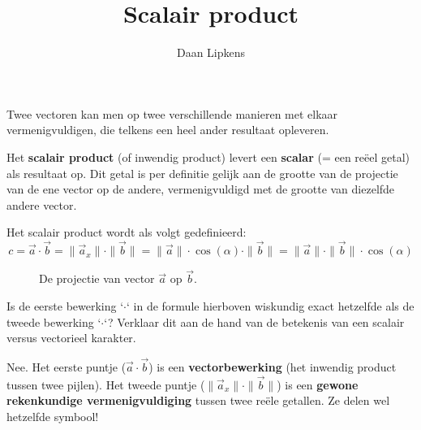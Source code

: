 \documentclass{ximera}
\title{Scalair product}
\author{Daan Lipkens}
\begin{document}
\begin{abstract}
\end{abstract}
\maketitle


Twee vectoren kan men op twee verschillende manieren met elkaar vermenigvuldigen, die telkens een heel ander resultaat opleveren. 

Het \textbf{scalair product} (of inwendig product) levert een \textbf{scalar} (= een reëel getal) als resultaat op. Dit getal is per definitie gelijk aan de grootte van de projectie van de ene vector op de andere, vermenigvuldigd met de grootte van diezelfde andere vector. 

Het scalair product wordt als volgt gedefinieerd: 
\[ c = \vec{a} \cdot \vec{b} = \| \vec{a}_x \| \cdot \|\vec{b}\| = \|\vec{a}\| \cdot \cos(\alpha) \cdot \|\vec{b}\| = \| \vec{a}\| \cdot \| \vec{b}\| \cdot \cos(\alpha) \]

\begin{figure}[ht!]
    \captionsetup{width=0.85\textwidth}
    \begin{center}
    \end{center}
    \caption{De projectie van vector $\vec{a}$ op $\vec{b}$.}
    \label{fig:scalair_product}
\end{figure}

\begin{question}
    Is de eerste bewerking `$\cdot$` in de formule hierboven wiskundig exact hetzelfde als de tweede bewerking `$\cdot$`? Verklaar dit aan de hand van de betekenis van een scalair versus vectorieel karakter.
    
    \begin{solution}\nl
        Nee. Het eerste puntje ($\vec{a} \cdot \vec{b}$) is een \textbf{vectorbewerking} (het inwendig product tussen twee pijlen). Het tweede puntje ($\| \vec{a}_x \| \cdot \|\vec{b}\|$) is een \textbf{gewone rekenkundige vermenigvuldiging} tussen twee reële getallen. Ze delen wel hetzelfde symbool!
    \end{solution}
\end{question}
\end{document}
